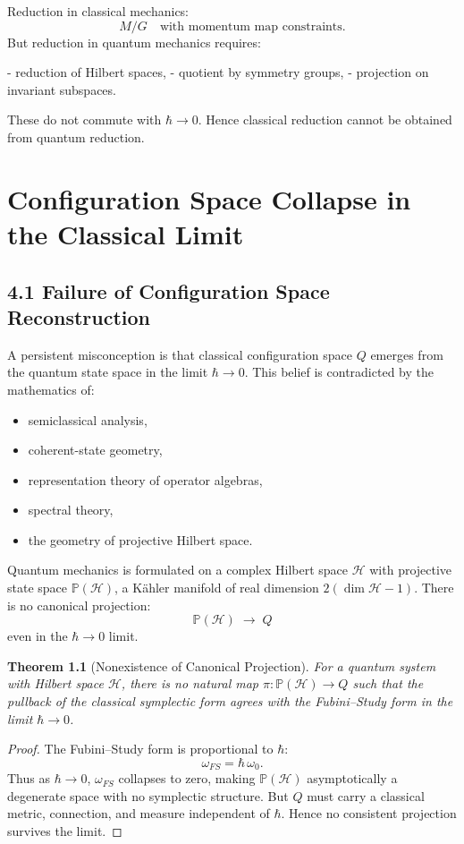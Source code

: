 \documentclass[12pt,oneside]{book}
\theoremstyle{plain}
\newtheorem{theorem}{Theorem}[chapter]
\theoremstyle{definition}
\begin{document}
Reduction in classical mechanics:  
\[
M/G \quad \text{with momentum map constraints}.
\]
But reduction in quantum mechanics requires:

- reduction of Hilbert spaces,
- quotient by symmetry groups,
- projection on invariant subspaces.

These do not commute with $\hbar\to0$.  
Hence classical reduction cannot be obtained from quantum reduction.



\chapter{Configuration Space Collapse in the Classical Limit}

\section{4.1 Failure of Configuration Space Reconstruction}

A persistent misconception is that classical configuration space $Q$ emerges from the quantum state space in the limit $\hbar\to 0$.  
This belief is contradicted by the mathematics of:

\begin{itemize}
\item semiclassical analysis,
\item coherent-state geometry,
\item representation theory of operator algebras,
\item spectral theory,
\item the geometry of projective Hilbert space.
\end{itemize}

Quantum mechanics is formulated on a complex Hilbert space $\mathcal{H}$ with projective state space $\mathbb{P}(\mathcal{H})$, a Kähler manifold of real dimension $2(\dim\mathcal{H}-1)$.  
There is no canonical projection:
\[
\mathbb{P}(\mathcal{H}) \;\to\; Q
\]
even in the $\hbar\to0$ limit.

\begin{theorem}[Nonexistence of Canonical Projection]
For a quantum system with Hilbert space $\mathcal{H}$, there is no natural map 
$\pi:\mathbb{P}(\mathcal{H})\to Q$  
such that the pullback of the classical symplectic form agrees with the Fubini–Study form in the limit $\hbar\to 0$.
\end{theorem}

\begin{proof}
The Fubini–Study form is proportional to $\hbar$:
\[
\omega_{FS} = \hbar \, \omega_0.
\]
Thus as $\hbar\to0$, $\omega_{FS}$ collapses to zero, making $\mathbb{P}(\mathcal{H})$ asymptotically a degenerate space with no symplectic structure.  
But $Q$ must carry a classical metric, connection, and measure independent of $\hbar$.  
Hence no consistent projection survives the limit.
\end{proof}
\end{document}
